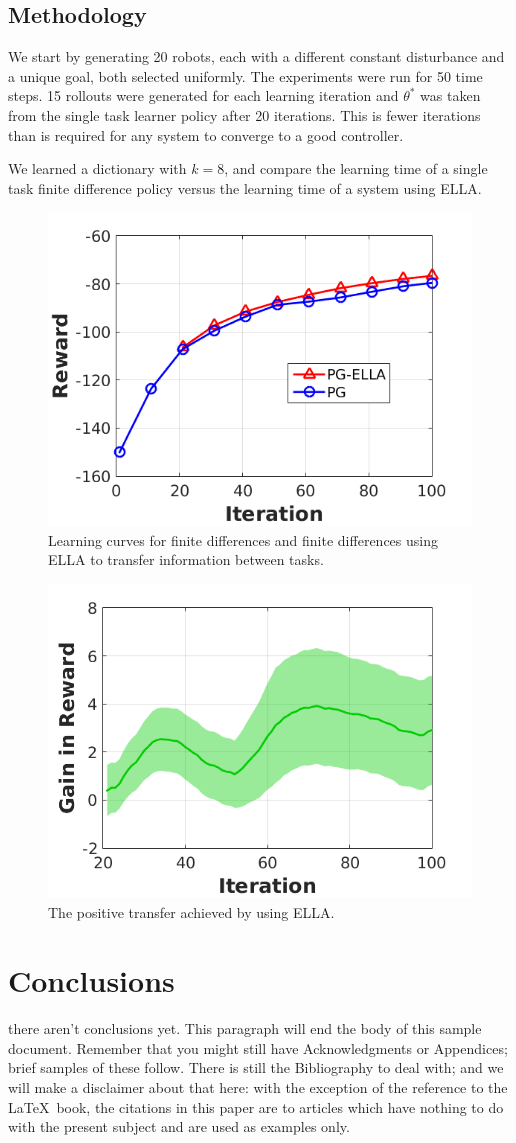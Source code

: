 \documentclass{aamas2016}
\begin{document}
\subsection{Methodology} 
We start by generating 20 robots, each with a different constant disturbance and a unique goal, both selected uniformly. The experiments were run for 50 time steps. 15 rollouts were generated for each learning iteration and $\theta^*$ was taken from the single task learner policy after 20 iterations. This is fewer iterations than is required for any system to converge to a good controller. 

We learned a dictionary with $k=8$, and compare the learning time of a single task finite difference policy versus the learning time of a system using ELLA.


\begin{figure}[!htbp]
    \centering
        \includegraphics[width=.3\textwidth]{images/2016_2_3_reward.png}
        \caption{Learning curves for finite differences and finite differences using ELLA to transfer information between tasks. }\label{fig:numfeat}
\end{figure}

\begin{figure}[!htbp]
    \centering
        \includegraphics[width=.3\textwidth]{images/2016_2_3_gain.png}
        \caption{The positive transfer achieved by using ELLA. }\label{fig:numfeat}
\end{figure}



\section{Conclusions}
{\color{red} there aren't conclusions yet.}
This paragraph will end the body of this sample document.
Remember that you might still have Acknowledgments or
Appendices; brief samples of these
follow.  There is still the Bibliography to deal with; and
we will make a disclaimer about that here: with the exception
of the reference to the \LaTeX\ book, the citations in
this paper are to articles which have nothing to
do with the present subject and are used as
examples only.
\end{document}
